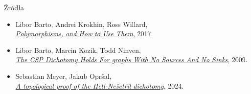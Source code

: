 \begin{frame}{Źródła}

\begin{itemize}
    \item Libor Barto, Andrei Krokhin, Ross Willard,\\
    \href{https://drops.dagstuhl.de/storage/02dagstuhl-follow-ups/dfu-vol007/DFU.Vol7.15301.1/DFU.Vol7.15301.1.pdf}{\textit{Polymorphisms, and How to Use Them}}, 2017.
    \item Libor Barto, Marcin Kozik, Todd Ninven,\\
    \href{https://www.karlin.mff.cuni.cz/~barto/Articles/CSPSmooth.pdf}{\textit{The CSP Dichotomy Holds For graphs With No Sources And No Sinks}}, 2009.
    \item Sebastian Meyer, Jakub Opr\v sal, \\
    \href{https://arxiv.org/abs/2409.12627}{\textit{A topological proof of the Hell-Ne\v set\v ril dichotomy}}, 2024.
\end{itemize}

\end{frame}